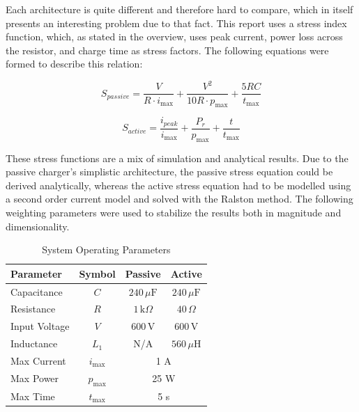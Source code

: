 \documentclass{article}
\begin{document}
Each architecture is quite different and therefore hard to compare, which in itself presents an interesting problem due to that fact. This report uses a stress index function, which, as stated in the 
overview, uses peak current, power loss across the resistor, and charge time as stress factors. The following equations were formed to describe this relation:

\begin{equation}
S_{passive} = \frac{V}{R \cdot i_{\max}} + \frac{V^2}{10R \cdot p_{\max}} + \frac{5RC}{t_{\max}}
\end{equation}

\begin{equation}
S_{active} = \frac{i_{peak}}{i_{\max}} + \frac{P_{r}}{p_{\max}} + \frac{t}{t_{\max}}
\end{equation}

\vspace{0.5cm}
These stress functions are a mix of simulation and analytical results. Due to the passive charger's simplistic architecture, the passive stress equation could be derived analytically, whereas the 
active stress equation had to be modelled using a second order current model and solved with the Ralston method. The following weighting parameters were used to stabilize the results both in magnitude and dimensionality. 

\begin{table}[H]
\centering
\begin{tabular}{|l|c|c|c|}
\hline
\textbf{Parameter} & \textbf{Symbol} & \textbf{Passive} & \textbf{Active} \\ \hline
Capacitance        & $C$             & $240\,\mu\text{F}$    & $240\,\mu\text{F}$   \\ \hline
Resistance         & $R$             & $1\,\text{k}\Omega$   & $40\,\Omega$         \\ \hline
Input Voltage      & $V$             & $600\,\text{V}$       & $600\,\text{V}$      \\ \hline
Inductance         & $L_1$           & N/A                   & $560\,\mu\text{H}$   \\ \hline \hline
Max Current        & $i_{\max}$      & \multicolumn{2}{c|}{1 A}                     \\ \hline
Max Power          & $p_{\max}$      & \multicolumn{2}{c|}{25 W}                    \\ \hline
Max Time           & $t_{\max}$      & \multicolumn{2}{c|}{5 s}                     \\ \hline
\end{tabular}
\caption{System Operating Parameters}
\end{table}
\end{document}
